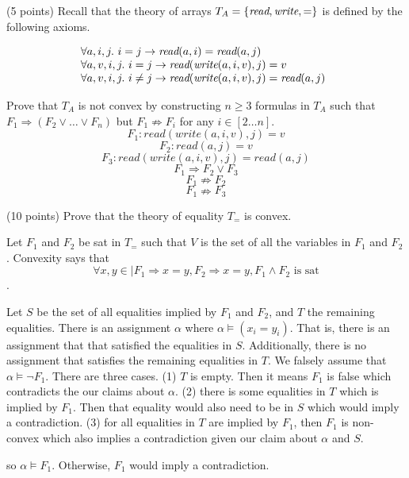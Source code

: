 \documentclass{handout}
\begin{document}
\begin{questions}
\begin{enumerate}
\end{enumerate}

\item (5 points) Recall that the theory of arrays $T_A =
\{\emph{read},\emph{write},=\}$ is defined by the following axioms.

\[
\begin{array}{@{}l}
\forall a,i,j. \ i = j \rightarrow \emph{read}(a, i) = \emph{read}(a, j)\\
\forall a,v,i,j. \ i = j \rightarrow \emph{read}(\emph{write}(a, i, v), j) = v\\
\forall a,v,i,j. \ i \neq j \rightarrow \emph{read}(\emph{write}(a, i, v), j) = \emph{read}(a, j)\\
\end{array}
\]

Prove that $T_A$ is not convex by constructing $n\geq 3$ formulas in $T_A$ such
that $F_1 \Rightarrow (F_2 \vee\ldots \vee F_n)$ but $F_1 \not\Rightarrow F_i$
for any $i \in [2\ldots n]$.
\[F_1 : read(write(a, i, v), j) = v\]
\[F_2 : read(a, j) = v\]
\[F_3 : read(write(a,i,v), j) = read(a, j)\]
\[ F_1 \Rightarrow F_2 \vee F_3\]
\[ F_1 \nRightarrow F_2 \]
\[ F_1 \nRightarrow F_3 \]


\item (10 points) \label{prob:smt:last} Prove that the theory of equality $T_=$
is convex.

Let $F_1$ and $F_2$ be sat in $T_{=}$ such that $V$ is the set of all the variables in $F_1$ and $F_2$. Convexity says that \[ \forall x, y \in | F_1 \Rightarrow x=y, F_2 \Rightarrow x=y,  F_1 \wedge F_2 \text{ is sat} \].

Let $S$ be the set of all equalities implied by $F_1$ and $F_2$, and $T$ the remaining equalities. There is an assignment $\alpha$ where $\alpha \models (x_i=y_i)$. That is, there is an assignment that that satisfied the equalities in $S$. Additionally, there is no assignment that satisfies the remaining equalities in $T$. We falsely assume that $\alpha \models \neg F_1$. There are three cases.
(1) $T$ is empty. Then it means $F_1$ is false which contradicts the our claims about $\alpha$.
(2) there is some equalities in $T$ which is implied by $F_1$. Then that equality would also need to be in $S$ which would imply a contradiction.
(3) for all equalities in $T$ are implied by $F_1$, then $F_1$ is non-convex which also implies a contradiction given our claim about $\alpha$ and $S$.

so $\alpha \models F_1$. Otherwise, $F_1$ would imply a contradiction. 



\end{questions}
\end{document}

